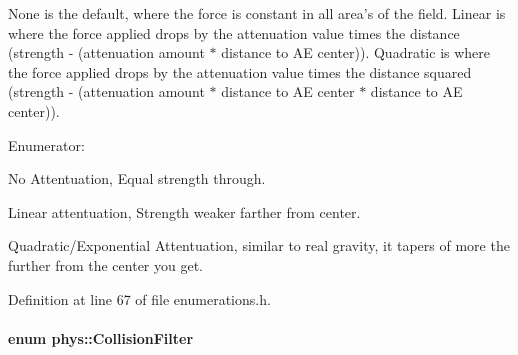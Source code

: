 None is the default, where the force is constant in all area's of the field. Linear is where the force applied drops by the attenuation value times the distance (strength -\/ (attenuation amount $\ast$ distance to AE center)). Quadratic is where the force applied drops by the attenuation value times the distance squared (strength -\/ (attenuation amount $\ast$ distance to AE center $\ast$ distance to AE center)). \begin{Desc}
\item[Enumerator: ]\par
\begin{description}
\item[{\em 
\hypertarget{namespacephys_ad4ce7ee5c1cc164f2ea3d5f28211739faec47e7157a10201b7aef0c1cbb6ccb5d}{
Att\_\-None}
\label{df/dec/namespacephys_ad4ce7ee5c1cc164f2ea3d5f28211739faec47e7157a10201b7aef0c1cbb6ccb5d}
}]No Attentuation, Equal strength through. \item[{\em 
\hypertarget{namespacephys_ad4ce7ee5c1cc164f2ea3d5f28211739fabcceb16182220293f2260edb41b548f1}{
Att\_\-Linear}
\label{df/dec/namespacephys_ad4ce7ee5c1cc164f2ea3d5f28211739fabcceb16182220293f2260edb41b548f1}
}]Linear attentuation, Strength weaker farther from center. \item[{\em 
\hypertarget{namespacephys_ad4ce7ee5c1cc164f2ea3d5f28211739fac9ef08c39daa338975f4f8879e86100b}{
Att\_\-Quadratic}
\label{df/dec/namespacephys_ad4ce7ee5c1cc164f2ea3d5f28211739fac9ef08c39daa338975f4f8879e86100b}
}]Quadratic/Exponential Attentuation, similar to real gravity, it tapers of more the further from the center you get. \end{description}
\end{Desc}



Definition at line 67 of file enumerations.h.

\hypertarget{namespacephys_aa69523df12b54123e76c40734556ca35}{
\paragraph[{CollisionFilter}]{\setlength{\rightskip}{0pt plus 5cm}enum {\bf phys::CollisionFilter}}\hfill}
\label{df/dec/namespacephys_aa69523df12b54123e76c40734556ca35}


